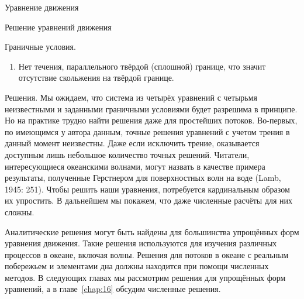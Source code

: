 \begin{chapter}{Уравнение движения}
\begin{section}{Решение уравнений движения}
\begin{paragraph}{Граничные условия.}
\begin{enumerate}
\item
Нет течения, параллельного твёрдой (сплошной) границе, что значит
отсутствие скольжения на твёрдой границе.
%
\end{enumerate}
\end{paragraph}

\begin{paragraph}{Решения.}
Мы ожидаем, что система из четырёх уравнений с четырьмя неизвестными и 
заданными граничными условиями будет разрешима в принципе. Но на практике 
трудно найти решения даже для простейших потоков. Во-первых, по имеющимся
у автора данным, точные решения уравнений с учетом трения в данный момент
неизвестны. Даже если исключить трение, оказывается доступным лишь небольшое 
количество точных решений. Читатели, интересующиеся океанскими волнами, могут
назвать в качестве примера результаты, полученные Герстнером для поверхностных
волн на воде (Lamb, 1945: 251). Чтобы решить наши уравнения, потребуется
кардинальным образом их упростить. В дальнейшем мы покажем, что даже
численные расчёты для них сложны.
%

Аналитические решения могут быть найдены для большинства упрощённых
форм уравнения движения. Такие решения используются для изучения
различных процессов в океане, включая волны. Решения для потоков в
океане с реальным побережьем и элементами дна должны находится при
помощи численных методов. В следующих главах мы рассмотрим решения для 
упрощённых форм уравнений, а в главе~\ref{chap:16} обсудим численные
решения.
%
\end{paragraph}
\end{section}


\end{chapter}
